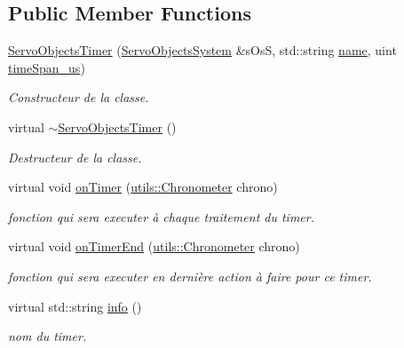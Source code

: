 \subsection*{Public Member Functions}
\begin{DoxyCompactItemize}
\item 
\hyperlink{classServoObjectsTimer_a63cc29effd9e265d70097c1eed5ca9a9}{Servo\+Objects\+Timer} (\hyperlink{classServoObjectsSystem}{Servo\+Objects\+System} \&s\+OsS, std\+::string \hyperlink{classITimerPosixListener_a56abc90e01e315320b855399b2c0096e}{name}, uint \hyperlink{classITimerPosixListener_a68a996ffa95155e824dec8653fbc8e40}{time\+Span\+\_\+us})
\begin{DoxyCompactList}\small\item\em Constructeur de la classe. \end{DoxyCompactList}\item 
\mbox{\label{classServoObjectsTimer_ad0c75559b7d324d0e4d67306018ea57c}} 
virtual \hyperlink{classServoObjectsTimer_ad0c75559b7d324d0e4d67306018ea57c}{$\sim$\+Servo\+Objects\+Timer} ()
\begin{DoxyCompactList}\small\item\em Destructeur de la classe. \end{DoxyCompactList}\item 
\mbox{\label{classServoObjectsTimer_a678b5b8c91a359ee1fc44c314e6d547e}} 
virtual void \hyperlink{classServoObjectsTimer_a678b5b8c91a359ee1fc44c314e6d547e}{on\+Timer} (\hyperlink{classutils_1_1Chronometer}{utils\+::\+Chronometer} chrono)
\begin{DoxyCompactList}\small\item\em fonction qui sera executer à chaque traitement du timer. \end{DoxyCompactList}\item 
\mbox{\label{classServoObjectsTimer_abb55f255d6ddbd31e94f1036bce541a9}} 
virtual void \hyperlink{classServoObjectsTimer_abb55f255d6ddbd31e94f1036bce541a9}{on\+Timer\+End} (\hyperlink{classutils_1_1Chronometer}{utils\+::\+Chronometer} chrono)
\begin{DoxyCompactList}\small\item\em fonction qui sera executer en dernière action à faire pour ce timer. \end{DoxyCompactList}\item 
\mbox{\label{classServoObjectsTimer_a1ee07c509698dc08dcfefa932fc89ec7}} 
virtual std\+::string \hyperlink{classServoObjectsTimer_a1ee07c509698dc08dcfefa932fc89ec7}{info} ()
\begin{DoxyCompactList}\small\item\em nom du timer. \end{DoxyCompactList}\end{DoxyCompactItemize}

